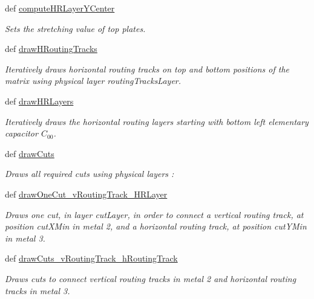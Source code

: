 \begin{DoxyCompactItemize}
def \hyperlink{classpython_1_1CapacitorRouted_1_1RoutMatchedCapacitor_a0d90b75abe0f4ce0f0b9b1b405462300}{compute\-H\-R\-Layer\-Y\-Center}
\begin{DoxyCompactList}\small\item\em Sets the stretching value of top plates. \end{DoxyCompactList}\item 
def \hyperlink{classpython_1_1CapacitorRouted_1_1RoutMatchedCapacitor_afbe39494b52b035fe3efdb0ddb896f69}{draw\-H\-Routing\-Tracks}
\begin{DoxyCompactList}\small\item\em Iteratively draws horizontal routing tracks on top and bottom positions of the matrix using physical layer {\ttfamily routing\-Tracks\-Layer}. \end{DoxyCompactList}\item 
def \hyperlink{classpython_1_1CapacitorRouted_1_1RoutMatchedCapacitor_a6bba48a4b1d4834c6617a5af5553be1c}{draw\-H\-R\-Layers}
\begin{DoxyCompactList}\small\item\em Iteratively draws the horizontal routing layers starting with bottom left elementary capacitor $ C_{00} $. \end{DoxyCompactList}\item 
def \hyperlink{classpython_1_1CapacitorRouted_1_1RoutMatchedCapacitor_a2019f4bb1e22a8d622ce4d155c934eb0}{draw\-Cuts}
\begin{DoxyCompactList}\small\item\em Draws all required cuts using physical layers \-: \end{DoxyCompactList}\item 
def \hyperlink{classpython_1_1CapacitorRouted_1_1RoutMatchedCapacitor_ab3fd42d04811b9c88654c0ca0e6e2de7}{draw\-One\-Cut\-\_\-v\-Routing\-Track\-\_\-\-H\-R\-Layer}
\begin{DoxyCompactList}\small\item\em Draws one cut, in layer {\ttfamily cut\-Layer}, in order to connect a vertical routing track, at position {\ttfamily cut\-X\-Min} in metal 2, and a horizontal routing track, at position {\ttfamily cut\-Y\-Min} in metal 3. \end{DoxyCompactList}\item 
def \hyperlink{classpython_1_1CapacitorRouted_1_1RoutMatchedCapacitor_a05e49f5537d31e0ab19b8a86eb6e7b1c}{draw\-Cuts\-\_\-v\-Routing\-Track\-\_\-h\-Routing\-Track}
\begin{DoxyCompactList}\small\item\em Draws cuts to connect vertical routing tracks in metal 2 and horizontal routing tracks in metal 3. \end{DoxyCompactList}\item 

\end{DoxyCompactItemize}
